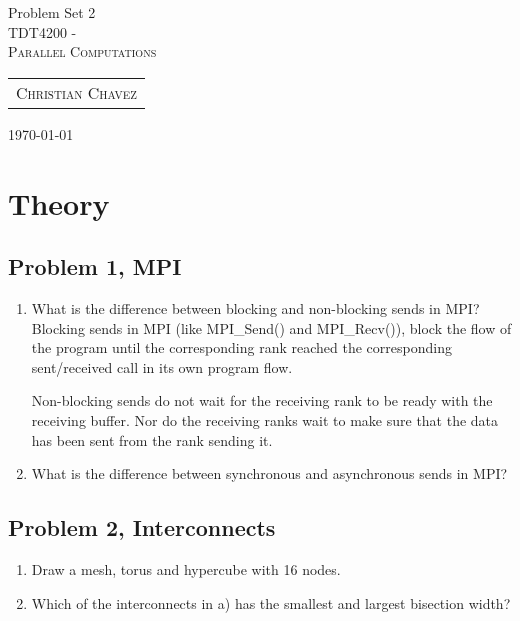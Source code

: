 \documentclass[fontsize=11pt, paper=a4, titlepage]{article}
\begin{document}
\begin{center}

{\huge Problem Set 2}\\[0.5cm]

\textsc{\LARGE TDT4200 -}\\[0.5cm]
\textsc{\large Parallel Computations}\\[1.0cm]

\begin{table}[h]
    \centering
    \begin{tabular}{c}
        \textsc{Christian Chavez}
    \end{tabular}
\end{table}

\end{center}
\vfill
\large{\today}
\clearpage

\section{Theory}
\subsection{Problem 1, MPI}

\begin{enumerate}
\renewcommand{\theenumi}{\Alph{enumi})}

    \item What is the difference between blocking and non-blocking sends in MPI?
Blocking sends in MPI (like MPI_Send() and MPI_Recv()), block the flow of the
program until the corresponding rank reached the corresponding sent/received call
in its own program flow.

Non-blocking sends do not wait for the receiving rank to be ready with the
receiving buffer. Nor do the receiving ranks wait to make sure that the data has
been sent from the rank sending it.

    \item What is the difference between synchronous and asynchronous sends in MPI?

\end{enumerate}

\subsection{Problem 2, Interconnects}

\begin{enumerate}
\renewcommand{\theenumi}{\Alph{enumi})}

    \item Draw a mesh, torus and hypercube with 16 nodes.

    \item Which of the interconnects in a) has the smallest and largest bisection width?

\end{enumerate}
\end{document}
